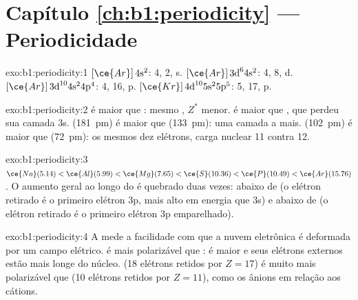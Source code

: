 \section*{Capítulo \ref{ch:b1:periodicity} --- Periodicidade}

\begin{solution}{exo:b1:periodicity:1}
 $[\ce{Ar}]\,4\text{s}^2$:  4,  2,  s. 
$[\ce{Ar}]\,3\text{d}^6 4\text{s}^2$:  4,  8,  d. 
$[\ce{Ar}]\,3\text{d}^{10} 4\text{s}^2 4\text{p}^4$:  4,  16, 
p.  $[\ce{Kr}]\,4\text{d}^{10} 5\text{s}^2 5\text{p}^5$:  5,
 17,  p.
\end{solution}

\begin{solution}{exo:b1:periodicity:2}
 é maior que : mesmo , $Z^{*}$ menor.  é
maior que , que perdeu sua camada 3s. 
(\qty{181}{pm}) é maior que  (\qty{133}{pm}): uma camada a mais.
 (\qty{102}{pm}) é maior que  (\qty{72}{pm}): os mesmos
dez elétrons, carga nuclear 11 contra 12.
\end{solution}

\begin{solution}{exo:b1:periodicity:3}
$\ce{Na} (5.14) < \ce{Al} (5.99) < \ce{Mg} (7.65) < \ce{S} (10.36) <
\ce{P} (10.49) < \ce{Ar} (15.76)$. O aumento geral ao longo do 
é quebrado duas vezes:  abaixo de  (o elétron retirado é o
primeiro elétron 3p, mais alto em energia que 3s) e  abaixo de 
(o elétron retirado é o primeiro elétron 3p emparelhado).
\end{solution}

\begin{solution}{exo:b1:periodicity:4}
A  mede a facilidade com que a nuvem eletrônica é
deformada por um campo elétrico.  é mais polarizável que :
é maior e seus elétrons externos estão mais longe do núcleo.  (18
elétrons retidos por $Z = 17$) é muito mais polarizável que  (10
elétrons retidos por $Z = 11$), como os ânions em relação aos cátions.
\end{solution}

